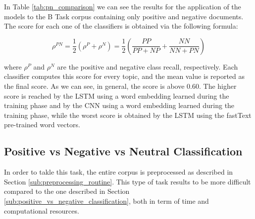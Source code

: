 \documentclass[11pt,twocolumn]{article}
\begin{document}
            \noindent
            In Table \ref{tab:pn_comparison} we can see the results for the application
            of the models to the B Task corpus containing only positive and negative documents. The score for
            each one of the classifiers is obtained via the following formula:

            \begin{equation*}
                \rho^{PN} =\frac{1}{2}(\rho^{P} + \rho^{N}) = \frac{1}{2}
                \left ( \frac{PP}{PP + NP} + \frac{NN}{NN + PN} \right )
            \end{equation*}

            \noindent
            where $\rho^{P}$ and $\rho^{N}$ are the positive and negative class recall, respectively. Each
            classifier computes this score for every topic, and the mean value is reported as the final score.
            As we can  see, in general, the score is above $0.60$. The higher score is
            reached by the LSTM using a word embedding learned during the training phase and by the CNN using a
            word embedding learned during the training phase, while the worst score is obtained by the LSTM using
            the fastText pre-trained word vectors.

        \subsection{Positive vs Negative vs Neutral Classification} %
        \label{sub:positive_vs_negative_vs_neutral_classification}
            In order to takle this task, the entire corpus is preprocessed as described in Section
            \ref{sub:preprocessing_routine}. This type of task results to be more difficult compared to
            the one described in Section \ref{sub:positive_vs_negative_classification}, both in term of
            time and computational resources.
\end{document}
